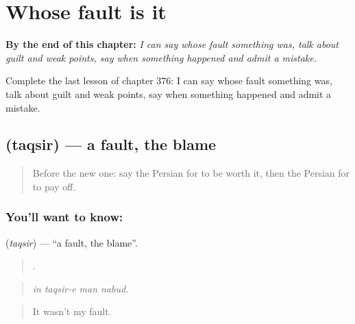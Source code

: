 
\chapter{Whose fault is it}
\label{ch:fa-whose-fault-is-it}

\begin{chapteropening}
\textbf{By the end of this chapter:} \emph{I can say whose fault something was, talk about guilt and weak points, say when something happened and admit a mistake.}

Complete the last lesson of chapter 376: I can say whose fault something was, talk about guilt and weak points, say when something happened and admit a mistake.
\end{chapteropening}

\section[\texorpdfstring{\fa{تقصیر} (taqsir)}{تقصیر (taqsir)}]{ (taqsir) — a fault, the blame}

\label{lesson:FA-C376-taqsir}



\begin{quote}
Before the new one: say the Persian for to be worth it, then the Persian for to pay off.
\end{quote}

\subsection*{You'll want to know: }
\textbf{} (\emph{taqsir}) — \textquotedblleft{}a fault, the blame\textquotedblright{}.

\begin{quote}
   .
\end{quote}

\begin{quote}
\emph{in taqsir-e man nabud.}
\end{quote}

\begin{quote}
It wasn't my fault.
\end{quote}

